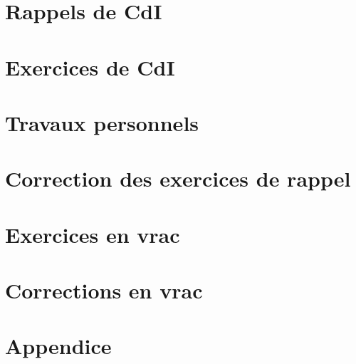 \chapter{Rappels de CdI}



\chapter{Exercices de CdI}



\chapter{Travaux personnels}


\chapter{Correction des exercices de rappel}


\chapter{Exercices en vrac}



 

\chapter{Corrections en vrac}




\appendix

\chapter{Appendice}
\pagestyle{plain}

\setcounter{section}{0}
\renewcommand{\theequation}{\Alph{section}.\arabic{equation}}
\renewcommand{\thenumtho}{\Alph{section}.\arabic{numtho}}
\renewcommand{\thesection}{\Alph{section}}



